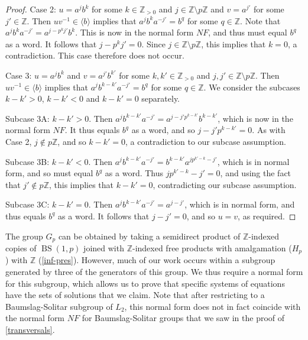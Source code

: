 \documentclass[11pt]{amsart}
\theoremstyle{definition}
\numberwithin{theorem}{section}
\DeclareMathOperator{\BS}{BS}
\newcommand{\Z}{\mathbb{Z}}
\begin{document}
\begin{proof}
		Case 2: \(u = a^j b^k\) for some \(k \in \Z_{> 0}\) and \(j \in \Z
		\setminus p \Z\) and \(v = a^{j'}\) for some \(j' \in \Z\). Then
		\(uv^{-1} \in \langle b \rangle\) implies that
		\(a^{j} b^k  a^{-j'} = b^q\) for some \(q \in \Z\). 
		Note that \(a^{j} b^k a^{-j'} = a^{j - p^k j'} b^k\). This is now
		in the normal form \(NF\), and thus must equal \(b^q\) as a word. It follows
		that \(j - p^k j' = 0\). Since \(j \in \Z \setminus p\Z\), this
		implies that \(k = 0\), a contradiction. This case therefore does
		not occur.

		Case 3: \(u = a^j b^k\) and \(v = a^{j'} b^{k'}\) for some
		\(k, k' \in \Z_{> 0}\) and \(j, j' \in \Z \setminus p\Z\). Then
		\(uv^{-1} \in \langle b \rangle\) implies that
		\( a^j b^{k - k'} a^{-j'} = b^q\) for some \(q \in \Z\). We consider
		the subcases \(k - k' > 0\), \(k - k' < 0\) and \(k - k' = 0\)
		separately.

		Subcase 3A: \(k - k' > 0\). Then \(a^j b^{k - k'} a^{-j'} = 
		a^{j -j' p^{k - k'}} b^{k - k'}\), which is now in the normal form \(NF\).
		It thus equals \(b^q\) as a word, and so \(j - j' p^{k - k'}
		= 0\). As with Case 2, \(j \notin p\Z\), and so \(k - k' = 0\),
		a contradiction to our subcase assumption. 

		Subcase 3B: \(k - k' < 0\). Then \(a^j b^{k - k'} a^{-j'}
		= b^{k - k'} a^{j p^{k' - k} - j'}\), which is in normal form,
		and so must equal \(b^q\) as a word. Thus \(j p^{k' - k} -j' = 0\),
		and using the fact that \(j' \notin p\Z\), this implies that
		\(k - k' = 0\), contradicting our subcase assumption.

		Subcase 3C: \(k - k' = 0\). Then \(a^j b^{k - k'} a^{-j'}
		= a^{j - j'}\), which is in normal form, and thus equals 
		\(b^q\) as a word. It follows that \(j - j' = 0\), and so
		\(u = v\), as required.
\end{proof}

The group \(G_p\) can be obtained by taking a semidirect product of
\(\Z\)-indexed copies of \(\BS(1, p)\) joined with \(\Z\)-indexed free products
with amalgamation (\(H_p\)) with \(\Z\) (\cref{inf-pres}). However, much of our
work occurs within a subgroup generated by three of the generators of this
group. We thus require a normal form for this subgroup, which allows us to
prove that specific systems of equations have the sets of solutions that we
claim. Note that after restricting to a Baumslag-Solitar subgroup of \(L_2\),
this normal form does not in fact coincide with the normal form \(NF\) for
Baumslag-Solitar groups that we saw in the proof of \cref{transversals}.
\end{document}
